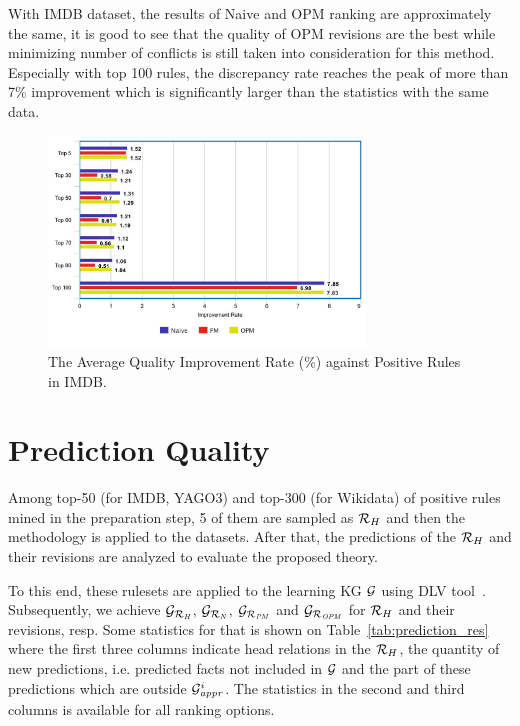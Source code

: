 With IMDB dataset, the results of Naive and OPM ranking are approximately the same, it is good to see that the quality of OPM revisions are the best while minimizing number of conflicts is still taken into consideration for this method. Especially with top 100 rules, the discrepancy rate reaches the peak of more than 7\% improvement which is significantly larger than the statistics with the same data.

\begin{figure}[ht]
\centering
\includegraphics[width=0.75\textwidth]{figures/table_1_5_imdb.jpeg}
\caption{The Average Quality Improvement Rate (\%) against Positive Rules in IMDB.}
\label{fig_1_5_imdb}
\end{figure}

\section{Prediction Quality}

Among top-50 (for IMDB, YAGO3) and top-300 (for Wikidata) of positive rules mined in the preparation step, 5 of them are sampled as $\mathcal{R}_H$ and then the methodology is applied to the datasets. After that, the predictions of the $\mathcal{R}_H$ and their revisions are analyzed to evaluate the proposed theory.

To this end, these rulesets are applied to the learning KG $\mathcal{G}$ using DLV tool~\cite{dlv}. Subsequently, we achieve $\mathcal{G}_{\mathcal{R}_{\mathit{H}}}$, $\mathcal{G}_{\mathcal{R}_{\mathit{N}}}$, $\mathcal{G}_{\mathcal{R}_{\mathit{PM}}}$ and $\mathcal{G}_{\mathcal{R}_{\mathit{OPM}}}$ for $\mathcal{R}_H$ and their revisions, resp. Some statistics for that is shown on Table~\ref{tab:prediction_res} where the first three columns indicate head relations in the $\mathcal{R}_H$, the
quantity of new predictions, i.e. predicted facts not included in $\mathcal{G}$ and the part of these predictions which are outside $\mathcal{G}^i_{\mathit{appr}}$. The statistics in the second and third columns is available for all ranking options.

